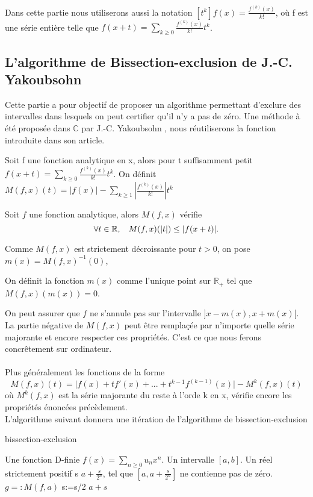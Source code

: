 \documentclass[a4paper,10.5pt]{article}
\begin{document}
	Dans cette partie nous utiliserons aussi la notation $[t^k]f(x)=\frac{f^{(k)}(x)}{k!}$, où f est une série entière telle que $f(x+t)=\sum_{k\geq0}\frac{f^{(k)}(x)}{k!}t^k$.
	\subsection{L'algorithme de Bissection-exclusion de J.-C. Yakoubsohn}
	
	Cette partie a pour objectif de proposer un algorithme permettant d'exclure des intervalles dans lesquels on peut certifier qu'il n'y a pas de zéro. Une méthode à été proposée dans $\mathbb{C}$ par J.-C. Yakoubsohn \cite{DBLP:journals/jc/Yakoubsohn05}, nous réutiliserons la fonction introduite dans son article.
	
	\begin{definition}Soit f une fonction analytique en x, alors pour t suffisamment petit\\ $f(x+t)=\sum_{k\geq0} \frac{f^{(k)}(x)}{k!}t^{k}$. On définit $M(f,x)(t)=|f(x)|-\sum_{k\geq1}|\frac{f^{(k)}(x)}{k!}|t^{k}$
	\end{definition}
	\begin{proposition}
		Soit $f$ une fonction analytique, alors $M(f,x)$ vérifie 
		\[\forall t \in \mathbb{R}, \hspace{3mm} M(f,x)(|t|) \leq |f(x+t)|.\]
	\end{proposition}
	Comme $M(f,x)$ est strictement décroissante pour $t>0$, on pose $m(x)=M(f,x)^{-1}(0)$, 
	\begin{definition}
		On définit la fonction $m(x)$ comme l'unique point sur $\mathbb{R}_+$ tel que $M(f,x)(m(x))=0$.
	\end{definition} 
	On peut assurer que $f$ ne s'annule pas sur l'intervalle $]x-m(x),x+m(x)[$.
	La partie négative de $M(f,x)$ peut être remplaçée par n'importe quelle série majorante et encore respecter ces propriétés. C'est ce que nous ferons concrêtement sur ordinateur.\\
	\\
	Plus généralement les fonctions de la forme \[M(f,x)(t)=\big|f(x)+tf'(x)+...+t^{k-1}f^{(k-1)}(x)\big|-M^{k}(f,x)(t)\] où $M^{k}(f,x)$ est la série  majorante du reste à l'orde k en x, vérifie encore les propriétés énoncées précèdement.\\
	
	\noindent L'algorithme suivant donnera une itération de l'algorithme de bissection-exclusion 
	
	
	\begin{algorithm}
		\caption{bissection-exclusion}
		\begin{algorithmic}[1]
			\REQUIRE Une fonction D-finie $f(x)=\sum_{n \geq 0} u_nx^{n}$. Un intervalle $[a,b]$. Un réel strictement positif s
			\ENSURE $a+\frac{s}{2^n}$, tel que $[a,a+\frac{s}{2^n}]$ ne contienne pas de zéro.
			\STATE $g=:M(f,a)$
			\STATE s:=s/2
			\ENDWHILE
			\RETURN $a+s$
		\end{algorithmic}
		
	\end{algorithm}
	
\end{document}
